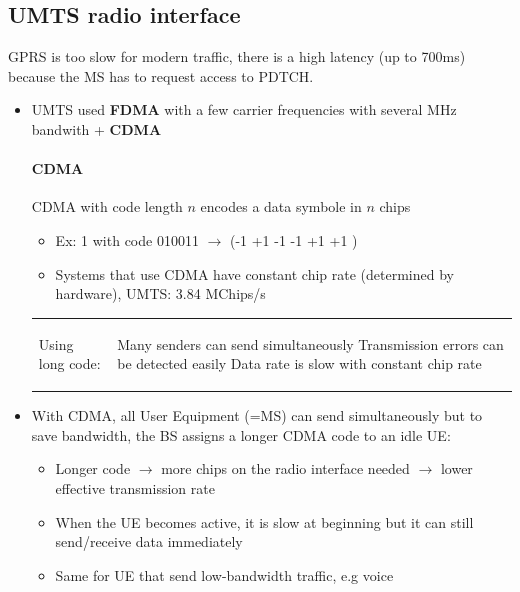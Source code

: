 \subsection{UMTS radio interface}
GPRS is too slow for modern traffic, there is a high latency (up to 700ms) 
because the MS has to request access to PDTCH.
\begin{itemize}
    \item UMTS used \textbf{FDMA} with a few carrier frequencies with several MHz bandwith
        + \textbf{CDMA}

        \paragraph{CDMA}
        CDMA with code length $n$ encodes a data symbole in $n$ chips
        \begin{itemize}
            \item Ex: 1 with code 010011 $\to$ (-1 +1 -1 -1 +1 +1 )
            \item Systems that use CDMA have constant chip rate (determined by hardware),
                UMTS: 3.84 MChips/s
        \end{itemize}

        \begin{tabular}{lm{10cm}}
            Using long code: &
            \begin{itemize}
                    \proitem{} Many senders can send simultaneously
                    \proitem{} Transmission errors can be detected easily
                    \consitem{} Data rate is slow with constant chip rate
            \end{itemize}
        \end{tabular}

    \item With CDMA, all User Equipment (=MS) can send simultaneously but to save
        bandwidth, the BS assigns a longer CDMA code to an idle UE:
        \begin{itemize}
            \item Longer code $\to$ more chips on the radio interface needed
                $\to$ lower effective transmission rate
            \item When the UE becomes active, it is slow at beginning but it can still
                send/receive data immediately 
            \item Same for UE that send low-bandwidth traffic, e.g voice
        \end{itemize}
\end{itemize}

